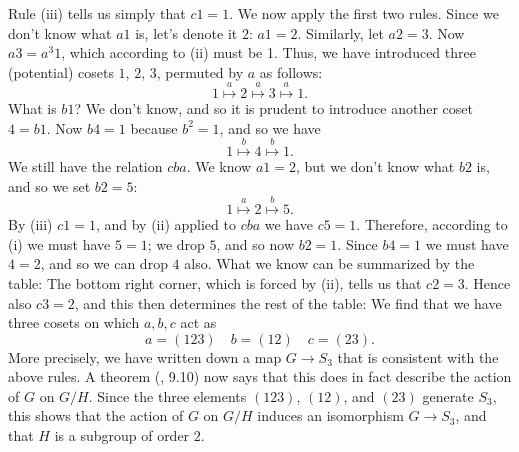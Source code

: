 \documentclass[a4paper,11pt,final]{memoir}%
\theoremstyle{nonumberplain}
\begin{document}
Rule (iii) tells us simply that $c1=1$. We now apply the first two rules.
Since we don't know what $a1$ is, let's denote it $2$: $a1=2$. Similarly, let
$a2=3$. Now $a3=a^{3}1$, which according to (ii) must be 1. Thus, we have
introduced three (potential) cosets $1$, $2$, $3$, permuted by $a$ as
follows:
\[
1\overset{a}{\mapsto}2\overset{a}{\mapsto}3\overset{a}{\mapsto}1.
\]
What is $b1$? We don't know, and so it is prudent to introduce another coset
$4=b1$. Now $b4=1$ because $b^{2}=1$, and so we have
\[
1\overset{b}{\mapsto}4\overset{b}{\mapsto}1.
\]
We still have the relation $cba$. We know $a1=2$, but we don't know what $b2$
is, and so we set $b2=5$:%
\[
1\overset{a}{\mapsto}2\overset{b}{\mapsto}5.
\]
By (iii) $c1=1$, and by (ii) applied to $cba$ we have $c5=1$. Therefore,
according to (i) we must have $5=1$; we drop $5$, and so now $b2=1$. Since
$b4=1$ we must have $4=2$, and so we can drop $4$ also. What we know can be
summarized by the table:
The bottom right corner, which is forced by (ii), tells us that $c2=3$. Hence
also $c3=2$, and this then determines the rest of the table:
We find that we have three cosets on which $a,b,c$ act as
\[
a=(123)\quad b=(12)\quad c=(23).
\]
More precisely, we have written down a map $G\rightarrow S_{3}$ that is
consistent with the above rules. A theorem (\cite{artin1991}, 9.10) now says
that this does in fact describe the action of $G$ on $G/H$. Since the three
elements $(123)$, $(12)$, and $(23)$ generate $S_{3}$, this shows that the
action of $G$ on $G/H$ induces an isomorphism $G\rightarrow S_{3}$, and that
$H$ is a subgroup of order $2$.
\end{document}
